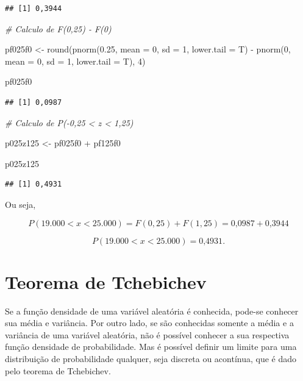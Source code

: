 \documentclass[
]{book}
\newenvironment{Shaded}{\begin{snugshade}}{\end{snugshade}}
\newcommand{\AttributeTok}[1]{\textcolor[rgb]{0.77,0.63,0.00}{#1}}
\newcommand{\CommentTok}[1]{\textcolor[rgb]{0.56,0.35,0.01}{\textit{#1}}}
\newcommand{\DecValTok}[1]{\textcolor[rgb]{0.00,0.00,0.81}{#1}}
\newcommand{\FloatTok}[1]{\textcolor[rgb]{0.00,0.00,0.81}{#1}}
\newcommand{\FunctionTok}[1]{\textcolor[rgb]{0.00,0.00,0.00}{#1}}
\newcommand{\NormalTok}[1]{#1}
\newcommand{\OtherTok}[1]{\textcolor[rgb]{0.56,0.35,0.01}{#1}}
\newcommand{\SpecialCharTok}[1]{\textcolor[rgb]{0.00,0.00,0.00}{#1}}
\begin{document}
\begin{verbatim}
## [1] 0,3944
\end{verbatim}

\begin{Shaded}
\begin{Highlighting}[]
\CommentTok{\# Calculo de F(0,25) {-} F(0)}

\NormalTok{pf025f0 }\OtherTok{\textless{}{-}} \FunctionTok{round}\NormalTok{(}\FunctionTok{pnorm}\NormalTok{(}\FloatTok{0.25}\NormalTok{, }\AttributeTok{mean =} \DecValTok{0}\NormalTok{, }\AttributeTok{sd =} \DecValTok{1}\NormalTok{, }\AttributeTok{lower.tail =}\NormalTok{ T) }\SpecialCharTok{{-}} 
    \FunctionTok{pnorm}\NormalTok{(}\DecValTok{0}\NormalTok{, }\AttributeTok{mean =} \DecValTok{0}\NormalTok{, }\AttributeTok{sd =} \DecValTok{1}\NormalTok{, }\AttributeTok{lower.tail =}\NormalTok{ T), }\DecValTok{4}\NormalTok{)}

\NormalTok{pf025f0}
\end{Highlighting}
\end{Shaded}

\begin{verbatim}
## [1] 0,0987
\end{verbatim}

\begin{Shaded}
\begin{Highlighting}[]
\CommentTok{\# Calculo de P({-}0,25 \textless{} z \textless{} 1,25)}

\NormalTok{p025z125 }\OtherTok{\textless{}{-}}\NormalTok{ pf025f0 }\SpecialCharTok{+}\NormalTok{ pf125f0}

\NormalTok{p025z125}
\end{Highlighting}
\end{Shaded}

\begin{verbatim}
## [1] 0,4931
\end{verbatim}

Ou seja,

\[
  P(19.000 < x <25.000) = F(0,25)  +  F(1,25) = \text{0,0987} + \text{0,3944}
\]

\[
  P(19.000 < x <25.000) = \text{0,4931}.
\]

\hypertarget{teorema-de-tchebichev}{%
\section{Teorema de Tchebichev}\label{teorema-de-tchebichev}}

Se a função densidade de uma variável aleatória é conhecida, pode-se conhecer sua média e variância. Por outro lado, se são conhecidas somente a média e a variância de uma variável aleatória, não é possível conhecer a sua respectiva função densidade de probabilidade. Mas é possível definir um limite para uma distribuição de probabilidade qualquer, seja discreta ou acontínua, que é dado pelo teorema de Tchebichev.
\end{document}

